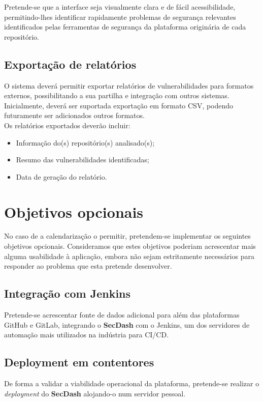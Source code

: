 Pretende-se que a interface seja visualmente clara e de fácil acessibilidade, permitindo-lhes identificar rapidamente problemas de segurança relevantes identificados pelas ferramentas de segurança da plataforma originária de cada repositório. \\

\subsection{Exportação de relatórios}

O sistema deverá permitir exportar relatórios de vulnerabilidades para formatos externos, possibilitando a sua partilha e integração com outros sistemas.\\

Inicialmente, deverá ser suportada exportação em formato CSV, podendo futuramente ser adicionados outros formatos.\\

Os relatórios exportados deverão incluir:
\begin{itemize}
	\item Informação do(s) repositório(s) analisado(s);
	\item Resumo das vulnerabilidades identificadas;
	\item Data de geração do relatório.
\end{itemize}

\section{Objetivos opcionais}
No caso de a calendarização o permitir, pretendem-se implementar os seguintes objetivos opcionais. Consideramos que estes objetivos poderiam acrescentar mais alguma usabilidade à aplicação, embora não sejam estritamente necessários para responder ao problema que esta pretende desenvolver. \\

\subsection{Integração com Jenkins}
Pretende-se acrescentar fonte de dados adicional para além das plataformas GitHub e GitLab, integrando o \textbf{SecDash} com o Jenkins, um dos servidores de automação mais utilizados na indústria para CI/CD. \\

\subsection{Deployment em contentores}
De forma a validar a viabilidade operacional da plataforma, pretende-se realizar o \textit{deployment} do \textbf{SecDash} alojando-o num servidor pessoal. \\


